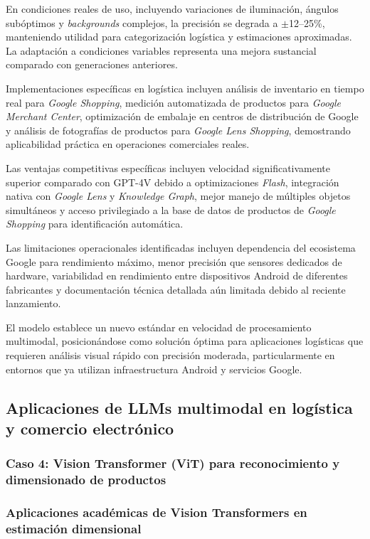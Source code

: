 En condiciones reales de uso, incluyendo variaciones de iluminación, ángulos subóptimos y \textit{backgrounds} complejos, la precisión se degrada a $\pm$12--25\%, manteniendo utilidad para categorización logística y estimaciones aproximadas. La adaptación a condiciones variables representa una mejora sustancial comparado con generaciones anteriores.

Implementaciones específicas en logística incluyen análisis de inventario en tiempo real para \textit{Google Shopping}, medición automatizada de productos para \textit{Google Merchant Center}, optimización de embalaje en centros de distribución de Google y análisis de fotografías de productos para \textit{Google Lens Shopping}, demostrando aplicabilidad práctica en operaciones comerciales reales.

Las ventajas competitivas específicas incluyen velocidad significativamente superior comparado con GPT-4V debido a optimizaciones \textit{Flash}, integración nativa con \textit{Google Lens} y \textit{Knowledge Graph}, mejor manejo de múltiples objetos simultáneos y acceso privilegiado a la base de datos de productos de \textit{Google Shopping} para identificación automática.

Las limitaciones operacionales identificadas incluyen dependencia del ecosistema Google para rendimiento máximo, menor precisión que sensores dedicados de hardware, variabilidad en rendimiento entre dispositivos Android de diferentes fabricantes y documentación técnica detallada aún limitada debido al reciente lanzamiento.

El modelo establece un nuevo estándar en velocidad de procesamiento multimodal, posicionándose como solución óptima para aplicaciones logísticas que requieren análisis visual rápido con precisión moderada, particularmente en entornos que ya utilizan infraestructura Android y servicios Google.

\subsection{Aplicaciones de LLMs multimodal en logística y comercio electrónico}

\subsubsection{Caso 4: Vision Transformer (ViT) para reconocimiento y dimensionado de productos}
\subsubsection{Aplicaciones académicas de Vision Transformers en estimación dimensional}

